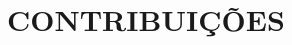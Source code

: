 \documentclass[pgmicro,diss,openright,oneside]{iiufrgs}
\begin{document}

\listoffigures

\listoftables

\tableofcontents

















%




\appendix

\chapter{CONTRIBUIÇÕES}
\end{document}
